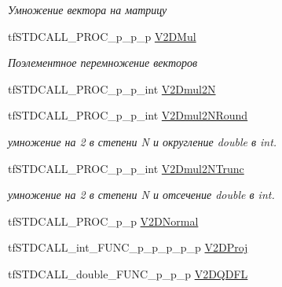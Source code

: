 \begin{DoxyCompactItemize}
\begin{DoxyCompactList}\small\item\em Умножение вектора на матрицу \end{DoxyCompactList}\item 
\hypertarget{structs_functions_vector_c_p_u_abae7a0848f247aaf233894fb7e5a4181}{tf\-S\-T\-D\-C\-A\-L\-L\-\_\-\-P\-R\-O\-C\-\_\-p\-\_\-p\-\_\-p \hyperlink{structs_functions_vector_c_p_u_abae7a0848f247aaf233894fb7e5a4181}{V2\-D\-Mul}}\label{structs_functions_vector_c_p_u_abae7a0848f247aaf233894fb7e5a4181}

\begin{DoxyCompactList}\small\item\em Поэлементное перемножение векторов \end{DoxyCompactList}\item 
tf\-S\-T\-D\-C\-A\-L\-L\-\_\-\-P\-R\-O\-C\-\_\-p\-\_\-p\-\_\-int \hyperlink{structs_functions_vector_c_p_u_abf22356b366d65df5bed6b92d51d5cb0}{V2\-Dmul2\-N}
\item 
\hypertarget{structs_functions_vector_c_p_u_af3a1c1db07b73d51d824b4956e84adf4}{tf\-S\-T\-D\-C\-A\-L\-L\-\_\-\-P\-R\-O\-C\-\_\-p\-\_\-p\-\_\-int \hyperlink{structs_functions_vector_c_p_u_af3a1c1db07b73d51d824b4956e84adf4}{V2\-Dmul2\-N\-Round}}\label{structs_functions_vector_c_p_u_af3a1c1db07b73d51d824b4956e84adf4}

\begin{DoxyCompactList}\small\item\em умножение на 2 в степени N и округление double в int. \end{DoxyCompactList}\item 
\hypertarget{structs_functions_vector_c_p_u_acdb2cc0fd8a5e90fce78812cb23a5160}{tf\-S\-T\-D\-C\-A\-L\-L\-\_\-\-P\-R\-O\-C\-\_\-p\-\_\-p\-\_\-int \hyperlink{structs_functions_vector_c_p_u_acdb2cc0fd8a5e90fce78812cb23a5160}{V2\-Dmul2\-N\-Trunc}}\label{structs_functions_vector_c_p_u_acdb2cc0fd8a5e90fce78812cb23a5160}

\begin{DoxyCompactList}\small\item\em умножение на 2 в степени N и отсечение double в int. \end{DoxyCompactList}\item 
tf\-S\-T\-D\-C\-A\-L\-L\-\_\-\-P\-R\-O\-C\-\_\-p\-\_\-p \hyperlink{structs_functions_vector_c_p_u_a45d3f485aec1a39ca8b28c6a13d08b46}{V2\-D\-Normal}
\item 
tf\-S\-T\-D\-C\-A\-L\-L\-\_\-int\-\_\-\-F\-U\-N\-C\-\_\-p\-\_\-p\-\_\-p\-\_\-p\-\_\-p \hyperlink{structs_functions_vector_c_p_u_adee8f9596f60749397e4ce367b49cf2c}{V2\-D\-Proj}
\item 
\hypertarget{structs_functions_vector_c_p_u_add57b376294895e9bbcd7cbd9bbfdbaa}{tf\-S\-T\-D\-C\-A\-L\-L\-\_\-double\-\_\-\-F\-U\-N\-C\-\_\-p\-\_\-p\-\_\-p \hyperlink{structs_functions_vector_c_p_u_add57b376294895e9bbcd7cbd9bbfdbaa}{V2\-D\-Q\-D\-F\-L}}\label{structs_functions_vector_c_p_u_add57b376294895e9bbcd7cbd9bbfdbaa}


\end{DoxyCompactItemize}
